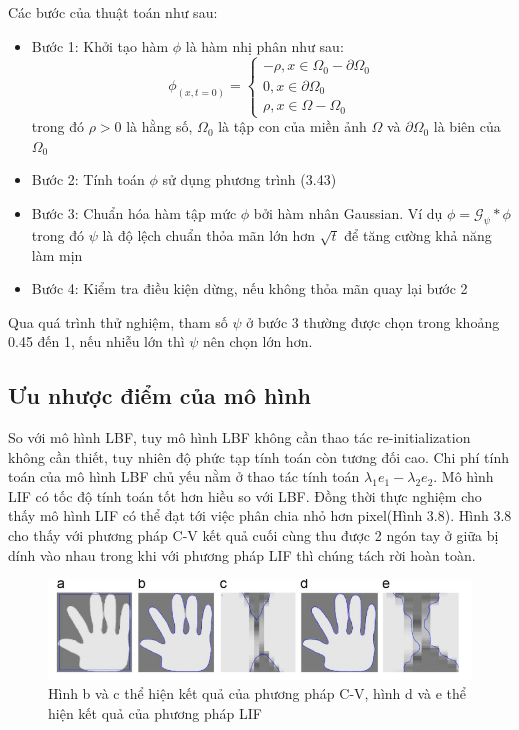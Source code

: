 \documentclass[14pt,oneside,a4paper]{extreport}
\newcommand{\G}{\mathcal G}
\begin{document}
Các bước của thuật toán như sau:
\begin{itemize}
\item Bước 1: Khởi tạo hàm $\phi$ là hàm nhị phân như sau:
\begin{equation*}
\phi_(x,t=0)=\begin{cases}
-\rho, x\in \Omega_0 -\partial \Omega_0\\
0, x\in \partial \Omega_0\\
\rho, x\in \Omega- \Omega_0
\end{cases}
\end{equation*}
 trong đó $\rho>0$ là hằng số, $\Omega_0$ là tập con  của miền ảnh $\Omega$ và $\partial \Omega_0$ là biên của $\Omega_0$
 \item Bước 2: Tính toán $\phi$ sử dụng phương trình (3.43)
 \item Bước 3: Chuẩn hóa hàm tập mức $\phi$ bởi hàm nhân Gaussian. Ví dụ $\phi=\G_{\psi}*\phi$ trong đó $\psi$ là độ lệch chuẩn thỏa mãn lớn hơn $\sqrt{t}$ để tăng cường khả năng làm mịn
 \item Bước 4: Kiểm tra điều kiện dừng, nếu không thỏa mãn quay lại bước 2
\end{itemize}
Qua quá trình thử nghiệm, tham số $\psi$ ở bước 3 thường được chọn trong khoảng 0.45 đến 1, nếu nhiễu lớn thì $\psi$ nên chọn lớn hơn.
\subsection{Ưu nhược điểm của mô hình}
So với mô hình LBF, tuy mô hình LBF không cần thao tác re-initialization không cần thiết, tuy nhiên độ phức tạp tính toán còn tương đối cao. Chi phí tính toán của mô hình LBF chủ yếu nằm ở thao tác tính toán $\lambda_1 e_1-\lambda_2 e_2$. Mô hình LIF có tốc độ tính toán tốt hơn hiều so với LBF. Đồng thời thực nghiệm cho thấy mô hình LIF có thể đạt tới việc phân chia nhỏ hơn pixel(Hình 3.8). Hình 3.8 cho thấy với phương pháp C-V kết quả cuối cùng thu được 2 ngón tay ở giữa bị dính vào nhau trong khi với phương pháp LIF thì chúng tách rời hoàn toàn.
\begin{center}
\begin{figure}
\includegraphics[scale=0.7]{figure/subpixel.png}
\caption{Hình b và c thể hiện kết quả của phương pháp C-V, hình  d và e thể hiện kết quả của phương pháp LIF}
\end{figure}

\end{center}   
\end{document}

